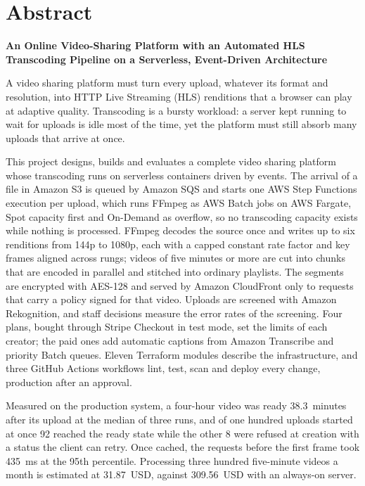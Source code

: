 \chapter*{Abstract}

\begin{center}
\textbf{\large An Online Video-Sharing Platform with an Automated HLS Transcoding Pipeline on a
Serverless, Event-Driven Architecture}
\end{center}
\vspace{0.5em}

A video sharing platform must turn every upload, whatever its format and resolution, into
HTTP Live Streaming (HLS) renditions that a browser can play at adaptive quality. Transcoding is a
bursty workload: a server kept running to wait for uploads is idle most of the time, yet the platform
must still absorb many uploads that arrive at once.

This project designs, builds and evaluates a complete video sharing platform whose transcoding runs on
serverless containers driven by events. The arrival of a file in Amazon S3 is queued by Amazon SQS and
starts one AWS Step Functions execution per upload, which runs FFmpeg as AWS Batch jobs on AWS Fargate,
Spot capacity first and On-Demand as overflow, so no transcoding capacity exists while nothing
is processed. FFmpeg decodes the source once and writes up to six renditions from 144p to 1080p, each
with a capped constant rate factor and key frames aligned across rungs; videos of five
minutes or more are cut into chunks that are encoded in parallel and stitched into ordinary playlists. The
segments are encrypted with AES-128 and served by Amazon CloudFront only to requests that carry a
policy signed for that video. Uploads are screened with Amazon Rekognition, and staff
decisions measure the error rates of the screening. Four plans, bought through Stripe Checkout in
test mode, set the limits of each creator; the paid ones add automatic captions from Amazon
Transcribe and priority Batch queues. Eleven Terraform modules describe
the infrastructure, and three GitHub Actions workflows lint, test, scan and deploy every change,
production after an approval.

Measured on the production system, a four-hour video was ready 38.3~minutes after its upload at the median of three runs, and of one
hundred uploads started at once 92 reached the ready state while the other 8 were refused at creation
with a status the client can retry. Once cached, the requests before the first frame took
435~ms at the 95th percentile. Processing three hundred five-minute videos a month is estimated at
31.87~USD, against 309.56~USD with an always-on server.
